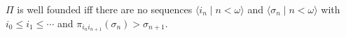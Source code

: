 $\Pi$ is well founded iff there are no sequences $\langle i_n \mid n < \omega \rangle$ and $\langle \sigma_n \mid n < \omega \rangle$ with $i_0 \leq i_1 \leq \cdots$ and $\pi_{i_n i_{n+1}}(\sigma_n) > \sigma_{n+1}$.
